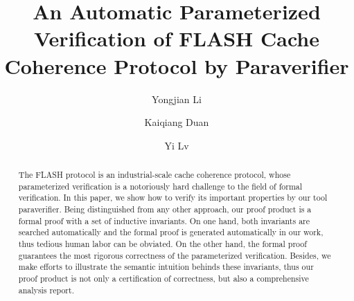 \documentclass{llncs}
\newcommand{\bedt}[1]{{\color{black}#1}}
\begin{document}
\title{  An Automatic Parameterized Verification of  FLASH Cache Coherence Protocol by Paraverifier}
\author{Yongjian Li  \and
        Kaiqiang Duan  \and
        Yi Lv  }

\maketitle

\begin{abstract}
The FLASH protocol is an industrial-scale cache coherence protocol, whose parameterized verification is a notoriously hard challenge to the field of formal \bedt{verification}. In this paper, we show how to verify its important properties by our tool {\sf paraverifier}. Being distinguished from any other approach, our proof product is a formal  proof with a set of inductive invariants. %
\bedt{On one hand, both invariants are searched automatically and the formal proof is generated automatically in our work, thus tedious human labor can be obviated. On the other hand, the formal proof guarantees the most rigorous correctness of the parameterized verification. Besides, we make efforts to illustrate the semantic intuition behinds these invariants, thus our proof product is not only a certification of correctness, but also a comprehensive analysis report.}

\end{abstract}
\end{document}
